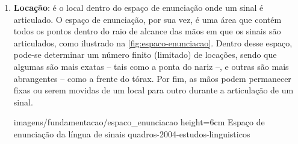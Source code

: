 \begin{enumerate}



    \item \textbf{Locação}: é o local dentro do espaço de enunciação onde um sinal é articulado. O espaço de enunciação, por sua vez, é uma área que contém todos os pontos dentro do raio de alcance das mãos em que os sinais são articulados, como ilustrado na \autoref{fig:espaco-enunciacao}. Dentro desse espaço, pode-se determinar um número finito (limitado) de locações, sendo que algumas são mais exatas -- tais como a ponta do nariz --, e outras são mais abrangentes -- como a frente do tórax. Por fim, as mãos podem permanecer fixas ou serem movidas de um local para outro durante a articulação de um sinal.
    
        {imagens/fundamentacao/espaco_enunciacao} %
        {height=6cm} %
        {Espaço de enunciação da língua de sinais} %
        {quadros-2004-estudos-linguisticos} %






\end{enumerate}
